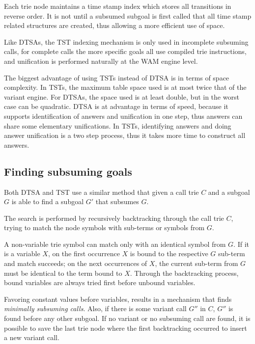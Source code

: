   Each trie node maintains a time stamp index which stores all transitions in reverse order.
  It is not until a subsumed subgoal is first called that all time stamp related structures are created, thus
  allowing a more efficient use of space.
  
  Like DTSAs, the TST indexing mechanism is only used in incomplete subsuming calls, for complete calls
  the more specific goals all use compiled trie instructions, and unification is performed naturally at
  the WAM engine level.
  
  The biggest advantage of using TSTs instead of DTSA is in terms of space complexity. In TSTs, the maximum table space
  used is at most twice that of the variant engine. For DTSAs, the space used is at least double, but in the worst
  case can be quadratic. DTSA is at advantage in terms of speed, because it supports identification of answers and
  unification in one step, thus answers can share some elementary unifications. In TSTs, identifying answers
  and doing answer unification is a two step process, thus it takes more time to construct all answers. 

\subsection{Finding subsuming goals}

Both DTSA and TST use a similar method that given a call trie $C$ and a subgoal $G$
is able to find a subgoal $G'$ that subsumes $G$.

The search is performed by recursively backtracking through the call trie $C$, trying
to match the node symbols with sub-terms or symbols from $G$.

A non-variable trie symbol can match only with an identical symbol from $G$. If it is
a variable $X$, on the first occurrence $X$ is bound to the respective $G$ sub-term
and match succeeds; on the next occurrences of $X$, the current sub-term from $G$ must
be identical to the term bound to $X$. Through the backtracking process, bound variables are
always tried first before unbound variables.

Favoring constant values before variables, results in a mechanism that finds \textit{minimally subsuming calls}.
Also, if there is some variant call $G''$ in $C$, $G''$ is found before any other subgoal. If no variant 
or no subsuming call are found, it is possible to save the last trie node where the first backtracking occurred
to insert a new variant call.